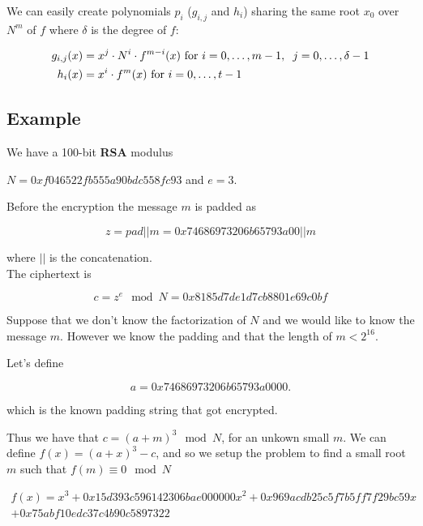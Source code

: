 \documentclass[a4paper,12pt]{report}
\begin{document}
We can easily create polynomials $p_i$ ($g_{i,j}$ and $h_i$)  sharing the same root $x_0$ over $N^m$ of $f$ where $\delta$ is the degree of $f$:

\begin{center}
    \begin{eqnarray}
        g_{i,j}(x) &= x^j \cdot N^i \cdot f^{m-i}(x) \text{ for } i = 0,\hdots,m-1,\hspace{2mm} j=0,\hdots,\delta-1 \label{eq:create_pol} \\
        h_i(x) &= x^i \cdot f^m(x) \text{ for } i = 0,\hdots,t-1 
    \end{eqnarray}
\end{center}

\subsection{Example}

We have a 100-bit \textbf{RSA} modulus

\begin{center}
    $N=0xf046522fb555a90bdc558fc93$ and $e = 3$.
\end{center}

Before the encryption the message $m$ is padded as

\[
    z = pad || m = 0x74686973206b65793a00 || m
\]

where $||$ is the concatenation.\\

The ciphertext is

\[
    c = z^e \mod N = 0x8185d7de1d7cb8801e69c0bf
\]

Suppose that we don't know the factorization of $N$ and we would like to know the message $m$.
However we know the padding and that the length of $m < 2^{16}$.

\vspace*{10px}

Let's define

\[
a = 0x74686973206b65793a0000
.\] 

which is the known padding string that got encrypted.

\vspace*{10px}

Thus we have that $c = (a + m)^3 \mod N$, for an unkown small $m$.
We can define $f(x) = (a + x)^3 - c$, and so we setup the problem to find a small root $m$ such that $f(m) \equiv 0 \mod N$

\begin{align*}
    f(x) = x^3 + 0x15d393c596142306bae000000x^2 + 0x969acdb25c5f7b5ff7f29bc59x \\
    + 0x75abf10edc37c4b90c5897322
\end{align*}
\end{document}
